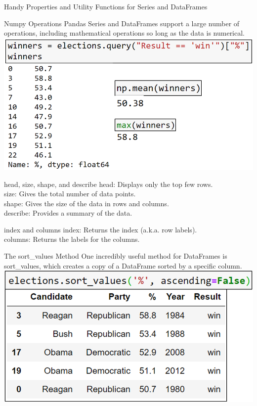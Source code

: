 \documentclass[aspectratio=169]{../latex_main/tntbeamer}  %
\begin{document}
	
	\begin{frame}{Handy Properties and Utility Functions for Series and DataFrames}
	    
	\end{frame}
	
	
	
	\begin{frame}{Numpy Operations}
	   Pandas Series and DataFrames support a large number of operations, including mathematical operations so long as the data is numerical.
	    \includegraphics[scale=.4]{Bild37}
	\end{frame}
	
	
	\begin{frame}[c]{head, size, shape, and describe}
	    head: Displays only the top few rows.\\
        size: Gives the total number of data points.\\
        shape: Gives the size of the data in rows and columns.\\
        describe: Provides a summary of the data.\\

	\end{frame}
	
	
	\begin{frame}[c]{index and columns}
	    index: Returns the index (a.k.a. row labels).\\
        columns: Returns the labels for the columns.
	\end{frame}
	
	
	\begin{frame}{The sort\_values Method}
	   One incredibly useful method for DataFrames is sort\_values, which creates a copy of a DataFrame sorted by a specific column.\\
	    \includegraphics[scale=.4]{Bild38}
	\end{frame}
	
\end{document}
